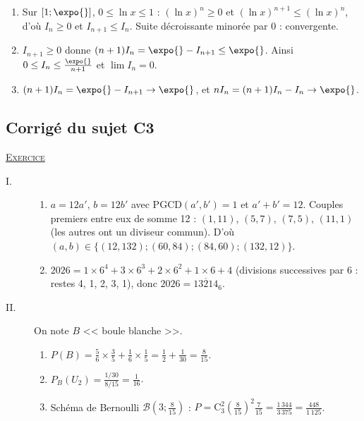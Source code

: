\begin{corrige}
\begin{enumerate}
      $I_2 = \expo{} - 2$ ; $I_3 = \expo{} - 3(\expo{} - 2) = 6 - 2\expo{}$.
\item Sur $[1 ; \expo{}]$, $0 \leq \ln x \leq 1$ : $(\ln x)^n \geq 0$ et $(\ln x)^{n+1} \leq (\ln x)^n$, d'o\`u $I_n \geq 0$ et $I_{n+1} \leq I_n$.
      Suite d\'ecroissante minor\'ee par 0 : convergente.
\item $I_{n+1} \geq 0$ donne $(n+1)I_n = \expo{} - I_{n+1} \leq \expo{}$. Ainsi $0 \leq I_n \leq \frac{\expo{}}{n+1}$ et $\lim I_n = 0$.
\item $(n+1)I_n = \expo{} - I_{n+1} \to \expo{}$, et $nI_n = (n+1)I_n - I_n \to \expo{}$.
\end{enumerate}

\subsection{Corrig\'e du sujet C3}
\noindent \underline{\textsc{Exercice}}
\begin{description}
\item[I.] \begin{enumerate}
      \item $a = 12a'$, $b = 12b'$ avec $\mathrm{PGCD}(a' , b') = 1$ et $a' + b' = 12$. Couples premiers entre eux de somme 12 :
            $(1 , 11)$, $(5 , 7)$, $(7 , 5)$, $(11 , 1)$ (les autres ont un diviseur commun). D'o\`u
            $(a , b) \in \{(12 , 132) ; (60 , 84) ; (84 , 60) ; (132 , 12)\}$.
      \item $2026 = 1 \times 6^4 + 3 \times 6^3 + 2 \times 6^2 + 1 \times 6 + 4$ (divisions successives par 6 : restes 4, 1, 2, 3, 1),
            donc $2026 = \overline{13214}_{6}$.
      \end{enumerate}
\item[II.] On note $B$ << boule blanche >>.
      \begin{enumerate}
      \item $P(B) = \frac{5}{6} \times \frac{3}{5} + \frac{1}{6} \times \frac{1}{5} = \frac{1}{2} + \frac{1}{30} = \frac{8}{15}$.
      \item $P_B(U_2) = \frac{1/30}{8/15} = \frac{1}{16}$.
      \item Sch\'ema de Bernoulli $\mathscr{B}\left(3 ; \frac{8}{15}\right)$ : $P = \mathrm{C}_3^2\left(\frac{8}{15}\right)^2\frac{7}{15} = \frac{1\,344}{3\,375} = \frac{448}{1\,125}$.
      \end{enumerate}
\end{description}


\end{corrige}
